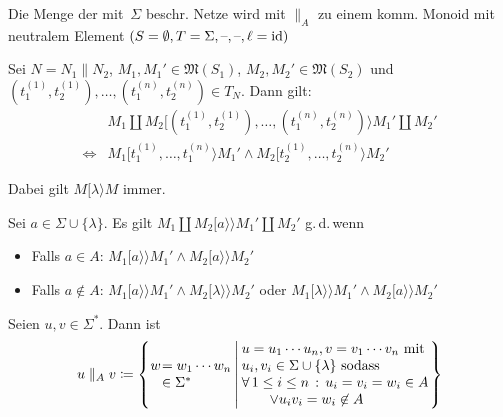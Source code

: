 \documentclass{cheat-sheet}
\newcommand{\activeTransition}[1]{[{#1}\rangle} %
\newcommand{\labelledTransition}[1]{[{#1}\rangle\rangle} %
\newcommand{\Markings}{\mathfrak{M}} %
\newcommand{\parallelComposition}{\parallel} %
\begin{document}
\begin{bem}
  Die Menge der mit~$\Sigma$ beschr. Netze wird mit $\parallelComposition_A$ zu einem komm. Monoid mit neutralem Element $(S = \emptyset, T = \Sigma, \text{--}, \text{--}, \ell = \operatorname{id})$
\end{bem}

\begin{lem}
  Sei $N = N_1 \parallelComposition N_2$, $M_1, M_1' \in \Markings(S_1)$, $M_2, M_2' \in \Markings(S_2)$ und $(t_1^{(1)}, t_2^{(1)}), \ldots, (t_1^{(n)}, t_2^{(n)}) \in T_N$.
  Dann gilt:
  \begin{align*}
    & M_1 \amalg M_2 \activeTransition{(t_1^{(1)}, t_2^{(1)}), \ldots, (t_1^{(n)}, t_2^{(n)})} M_1' \amalg M_2' \\
    \iff & M_1 \activeTransition{t_1^{(1)}, \ldots, t_1^{(n)}} M_1' \wedge
    M_2 \activeTransition{t_2^{(1)}, \ldots, t_2^{(n)}} M_2'
  \end{align*}
\end{lem}

\begin{bem}
  Dabei gilt $M \activeTransition{\lambda} M$ immer.
\end{bem}

\begin{lem}
  Sei $a \in \Sigma \cup \{ \lambda \}$.
  Es gilt $M_1 \amalg M_2 \labelledTransition{a} M_1' \amalg M_2'$ g.\,d.\,wenn
  \begin{itemize}
    \item Falls $a \in A$: \enspace $M_1 \labelledTransition{a} M_1' \wedge M_2 \labelledTransition{a} M_2'$
    \item Falls $a \not\in A$: \enspace $M_1 \labelledTransition{a} M_1' \wedge M_2 \labelledTransition{\lambda} M_2'$ oder $M_1 \labelledTransition{\lambda} M_1' \wedge M_2 \labelledTransition{a} M_2'$
  \end{itemize}
\end{lem}

\begin{defn}
  Seien $u, v \in \Sigma^*$.
  Dann ist
  \[
    \arraycolsep=0.4pt
    u \parallelComposition_A v \coloneqq
      \left\{
        \begin{array}{r l}
          w &= w_1 \cdots w_n \\
          &\in \Sigma^*
        \end{array}
      \,\middle|\,
        \begin{array}{l}
          u = u_1 \cdots u_n, v = v_1 \cdots v_n \text{ mit } \\
          u_i, v_i \in \Sigma \cup \{ \lambda \} \text{ sodass } \\
          \fa{1 \leq i \leq n} u_i = v_i = w_i \in A \\
          \qquad \vee u_i v_i = w_i \not\in A
        \end{array}
      \right\}
  \]
\end{defn}
\end{document}
